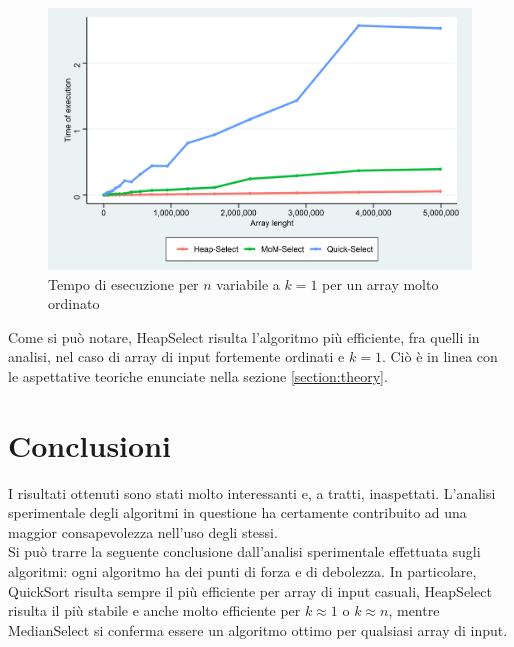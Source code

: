 \documentclass{article}
\begin{document}
	\begin{figure}[h!]
  		\includegraphics[width=\linewidth]{images/All_graph_ordered_k1.png}
  		\caption{Tempo di esecuzione per $n$ variabile a $k=1$ per un array molto ordinato}
  		\label{fig:graph6}
	\end{figure}
	Come si può notare, HeapSelect risulta l'algoritmo più efficiente, fra quelli in analisi, nel caso di array di input fortemente ordinati e $k=1$. Ciò è in linea con le aspettative teoriche enunciate nella sezione \ref{section:theory}.
	
	\newpage

	\section{Conclusioni}
	I risultati ottenuti sono stati molto interessanti e, a tratti, inaspettati. L'analisi sperimentale degli algoritmi in questione ha certamente contribuito ad una maggior consapevolezza nell'uso degli stessi.
	\\
	Si può trarre la seguente conclusione dall'analisi sperimentale effettuata sugli algoritmi: ogni algoritmo ha dei punti di forza e di debolezza. In particolare, QuickSort risulta sempre il più efficiente per array di input casuali, HeapSelect risulta il più stabile e anche molto efficiente per $k\approx 1 $ o $k \approx n$, mentre MedianSelect si conferma essere un algoritmo ottimo per qualsiasi array di input.
	
\end{document}
